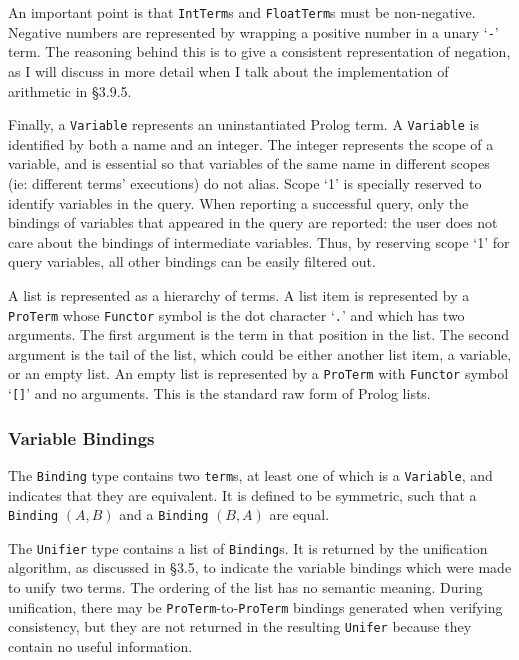 \documentclass[12pt]{article}
\begin{document}

An important point is that \verb|IntTerm|s and \verb|FloatTerm|s must be non-negative. 
Negative numbers are represented by wrapping a positive number in a unary `\verb|-|' term. 
The reasoning behind this is to give a consistent representation of negation, as I will discuss in more detail when I talk about the implementation of arithmetic in \S3.9.5.

Finally, a \verb|Variable| represents an uninstantiated Prolog term. 
A \verb|Variable| is identified by both a name and an integer. 
The integer represents the scope of a variable, and is essential so that variables of the same name in different scopes (ie: different terms' executions) do not alias. 
Scope `1' is specially reserved to identify variables in the query. 
When reporting a successful query, only the bindings of variables that appeared in the query are reported: the user does not care about the bindings of intermediate variables.
Thus, by reserving scope `1' for query variables, all other bindings can be easily filtered out.

A list is represented as a hierarchy of terms. 
A list item is represented by a \verb|ProTerm| whose \verb|Functor| symbol is the dot character `\verb|.|' and which has two arguments. 
The first argument is the term in that position in the list. 
The second argument is the tail of the list, which could be either another list item, a variable, or an empty list.
An empty list is represented by a \verb|ProTerm| with \verb|Functor| symbol `\verb|[]|' and no arguments. 
This is the standard raw form of Prolog lists.

\subsubsection{Variable Bindings}

The \verb|Binding| type contains two \verb|term|s, at least one of which is a \verb|Variable|, and indicates that they are equivalent. 
It is defined to be symmetric, such that a \verb|Binding| $(A,B)$ and a \verb|Binding| $(B,A)$ are equal.

The \verb|Unifier| type contains a list of \verb|Binding|s. 
It is returned by the unification algorithm, as discussed in \S3.5, to indicate the variable bindings which were made to unify two terms. 
The ordering of the list has no semantic meaning.
During unification, there may be \verb|ProTerm|-to-\verb|ProTerm| bindings generated when verifying consistency, but they are not returned in the resulting \verb|Unifer| because they contain no useful information.
\end{document}
